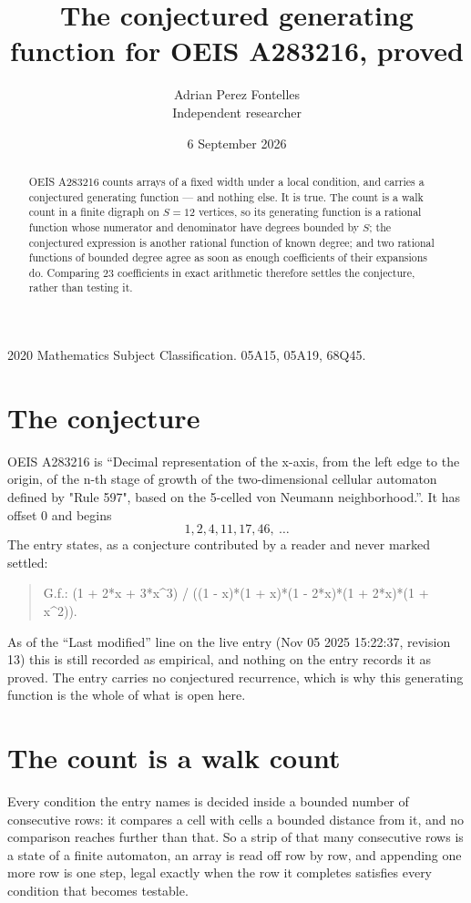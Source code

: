 \documentclass[11pt,a4paper]{article}
\title{The conjectured generating function for OEIS A283216, proved}
\author{Adrian Perez Fontelles\\ \small Independent researcher}
\date{6 September 2026}
\theoremstyle{plain}
\theoremstyle{definition}
\begin{document}
\maketitle

\begin{abstract}
OEIS A283216 counts arrays of a fixed width under a local condition, and carries a conjectured
generating function --- and nothing else. It is true. The count is a walk count in a finite
digraph on $S=12$ vertices, so its generating function is a rational function whose numerator
and denominator have degrees bounded by $S$; the conjectured expression is another rational
function of known degree; and two rational functions of bounded degree agree as soon as enough
coefficients of their expansions do. Comparing $23$ coefficients in exact arithmetic
therefore settles the conjecture, rather than testing it.
\end{abstract}

\noindent\small 2020 Mathematics Subject Classification. 05A15, 05A19, 68Q45.\normalsize

\section{The conjecture}

OEIS A283216 is ``Decimal representation of the x-axis, from the left edge to the origin, of the n-th stage of growth of the two-dimensional cellular automaton defined by "Rule 597", based on the 5-celled von Neumann neighborhood.''. It has offset $0$ and begins
\[
1, 2, 4, 11, 17, 46,\ \dots
\]
The entry states, as a conjecture contributed by a reader and never marked settled:
\begin{quote}
G.f.: (1 + 2*x + 3*x\^{}3) / ((1 - x)*(1 + x)*(1 - 2*x)*(1 + 2*x)*(1 + x\^{}2)).
\end{quote}
As of the ``Last modified'' line on the live entry (Nov 05 2025 15:22:37, revision 13) this is still
recorded as empirical, and nothing on the entry records it as proved. The entry carries no
conjectured recurrence, which is why this generating function is the whole of what is open
here.

\section{The count is a walk count}

Every condition the entry names is decided inside a bounded number of consecutive rows: it
compares a cell with cells a bounded distance from it, and no comparison reaches further than
that. So a strip of that many consecutive rows is a state of a finite automaton, an array is
read off row by row, and appending one more row is one step, legal exactly when the row it
completes satisfies every condition that becomes testable.
\end{document}
